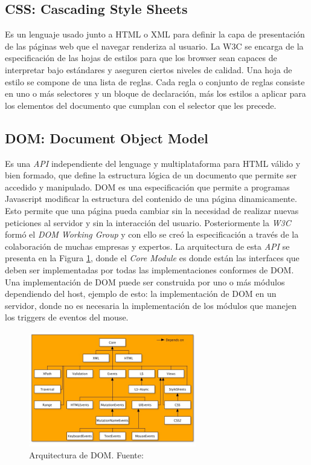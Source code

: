     \subsection{CSS: Cascading Style Sheets}
    \label{chap2:css}
    Es un lenguaje usado junto a HTML o XML para definir la capa de presentación de las páginas web que el navegar renderiza al usuario. La W3C se encarga de la especificación de las hojas de estilos para que los browser sean capaces de interpretar bajo estándares y aseguren ciertos niveles de calidad. Una hoja de estilo se compone de una lista de reglas. Cada regla o conjunto de reglas consiste en uno o más selectores y un bloque de declaración, más los estilos a aplicar para los elementos del documento que cumplan con el selector que les precede. 


    \subsection{DOM: Document Object Model}
    \label{chap2:DOM}
    Es una \textit{API} independiente del lenguage y multiplataforma para HTML válido y bien formado, que define la estructura lógica de un documento que permite ser accedido y manipulado. DOM es una especificación que permite a programas Javascript modificar la estructura del contenido de una página dinamicamente. Esto permite que una página pueda cambiar sin la necesidad de realizar nuevas peticiones al servidor y sin la interacción del usuario. Posteriormente la \textit{W3C} \cite{w3c} formó el \textit{DOM Working Group} y con ello se creó la especificación a través de la colaboración de muchas empresas y expertos. La arquitectura de esta \textit{API} se presenta en la Figura \ref{fig:DOM}, donde el \textit{Core Module} es donde están las interfaces que deben ser implementadas por todas las implementaciones conformes de DOM. Una implementación de DOM puede ser construida por uno o más módulos dependiendo del host, ejemplo de esto: la implementación de DOM en un servidor, donde no es necesaria la implementación de los módulos que manejen los triggers de eventos del mouse.
            
    \begin{figure}[h!t]
            \centering
        \includegraphics[width=0.65\textwidth]{figures/dom-architecture.jpg}
        \caption{Arquitectura de DOM. Fuente: \cite{w3c}}
        \label{fig:DOM}
    \end{figure}
            
